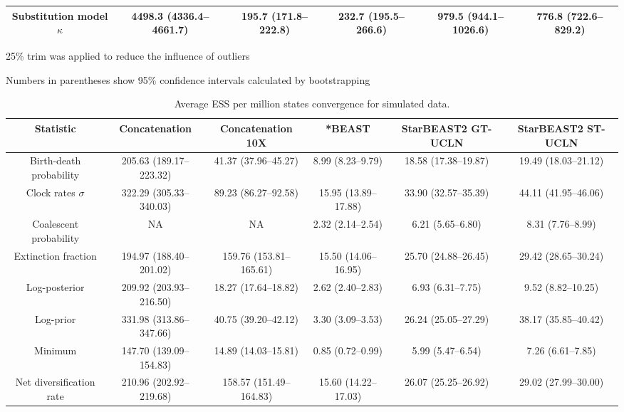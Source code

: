 \documentclass[12pt]{article}
\begin{document}
\begin{landscape}
\begin{table}[htb!]
\begin{threeparttable}
\begin{adjustbox}{center}
\begin{tabular}{|c|c|c|c|c|c|}
\hline
Substitution model $\kappa$ & 4498.3 (4336.4--4661.7) & 195.7 (171.8--222.8) & 232.7 (195.5--266.6) & 979.5 (944.1--1026.6) & 776.8 (722.6--829.2)\tabularnewline
\hline
\end{tabular}
\end{adjustbox}
\begin{tablenotes}
\footnotesize
\item 25\% trim was applied to reduce the influence of outliers
\item Numbers in parentheses show 95\% confidence intervals calculated by bootstrapping
\end{tablenotes}
\end{threeparttable}
\end{table}

\clearpage

\begin{table}[htb!]
\centering
\caption{Average ESS per million states convergence for simulated data.}
\label{tab:simulatedPerMstates}
\begin{threeparttable}
\begin{adjustbox}{center}
\renewcommand{\arraystretch}{1.2}
\footnotesize
\begin{tabular}{|c|c|c|c|c|c|}
\multicolumn{1}{c}{Statistic} & \multicolumn{1}{c}{Concatenation} & \multicolumn{1}{c}{Concatenation 10X} & \multicolumn{1}{c}{*BEAST} & \multicolumn{1}{c}{StarBEAST2 GT-UCLN} & \multicolumn{1}{c}{StarBEAST2 ST-UCLN}\tabularnewline
\hline
Birth-death probability & 205.63 (189.17--223.32) & 41.37 (37.96--45.27) & 8.99 (8.23--9.79) & 18.58 (17.38--19.87) & 19.49 (18.03--21.12)\tabularnewline
\hline
Clock rates $\sigma$ & 322.29 (305.33--340.03) & 89.23 (86.27--92.58) & 15.95 (13.89--17.88) & 33.90 (32.57--35.39) & 44.11 (41.95--46.06)\tabularnewline
\hline
Coalescent probability & NA & NA & 2.32 (2.14--2.54) & 6.21 (5.65--6.80) & 8.31 (7.76--8.99)\tabularnewline
\hline
Extinction fraction & 194.97 (188.40--201.02) & 159.76 (153.81--165.61) & 15.50 (14.06--16.95) & 25.70 (24.88--26.45) & 29.42 (28.65--30.24)\tabularnewline
\hline
Log-posterior & 209.92 (203.93--216.50) & 18.27 (17.64--18.82) & 2.62 (2.40--2.83) & 6.93 (6.31--7.75) & 9.52 (8.82--10.25)\tabularnewline
\hline
Log-prior & 331.98 (313.86--347.66) & 40.75 (39.20--42.12) & 3.30 (3.09--3.53) & 26.24 (25.05--27.29) & 38.17 (35.85--40.42)\tabularnewline
\hline
Minimum & 147.70 (139.09--154.83) & 14.89 (14.03--15.81) & 0.85 (0.72--0.99) & 5.99 (5.47--6.54) & 7.26 (6.61--7.85)\tabularnewline
\hline
Net diversification rate & 210.96 (202.92--219.68) & 158.57 (151.49--164.83) & 15.60 (14.22--17.03) & 26.07 (25.25--26.92) & 29.02 (27.99--30.00)\tabularnewline

\end{tabular}
\end{adjustbox}
\end{threeparttable}
\end{table}
\end{landscape}
\end{document}

